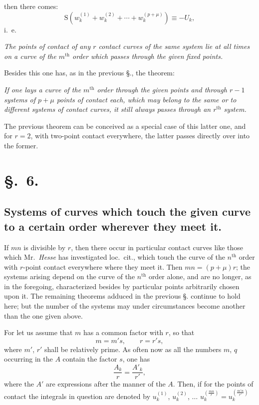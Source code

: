 \documentclass{article}
\begin{document}
then there comes:
\[ \mathrm{S}(w_{k}^{(1)} + w_{k}^{(2)} + \cdots + w_{k}^{(p+\mu)}) \equiv -U_{k}, \]
i.\ e.

\emph{The points of contact of any $r$ contact curves of the same system lie at all times on a curve of the $m^{\text{th}}$ order which passes through the given fixed points.}

Besides this one has, as in the previous §., the theorem:

\emph{If one lays a curve of the $m^{\text{th}}$ order through the given points and through $r-1$ systems of $p+\mu$ points of contact each, which may belong to the same or to different systems of contact curves, it still always passes through an $r^{\text{th}}$ system.}

The previous theorem can be conceived as a special case of this latter one, and for $r = 2$, with two-point contact everywhere, the latter passes directly over into the former.

\section*{§.~6.}
\subsection*{Systems of curves which touch the given curve to a certain order wherever they meet it.}

If $mn$ is divisible by $r$, then there occur in particular contact curves like those which Mr.\ \emph{Hesse} has investigated loc.\ cit., which touch the curve of the $n^{\text{th}}$ order with $r$-point contact everywhere where they meet it. Then $mn = (p+\mu)r$; the systems arising depend on the curve of the $n^{\text{th}}$ order alone, and are no longer, as in the foregoing, characterized besides by particular points arbitrarily chosen upon it. The remaining theorems adduced in the previous §. continue to hold here; but the number of the systems may under circumstances become another than the one given above.

For let us assume that $m$ has a common factor with $r$, so that
\[ m = m's, \qquad r = r's, \]
where $m'$, $r'$ shall be relatively prime. As often now as all the numbers $m$, $q$ occurring in the $A$ contain the factor $s$, one has
\[ \frac{A_{k}}{r} = \frac{A'_{k}}{r'}, \]
where the $A'$ are expressions after the manner of the $A$. Then, if for the points of contact the integrals in question are denoted by $u_{k}^{(1)}$, $u_{k}^{(2)}$, $\ldots$ $u_{k}^{\left(\frac{mn}{r}\right)} = u_{k}^{\left(\frac{m'n}{r'}\right)}$
\end{document}

